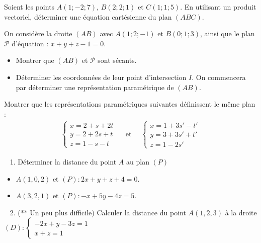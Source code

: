 \documentclass[letterpaper,10pt,english]{jupyterBook}
\begin{document}
\sphinxAtStartPar
{} Soient les points \(A(1;-2;7)\), \(B(2;2;1)\) et \(C(1;1;5)\). En utilisant un produit vectoriel, déterminer une équation cartésienne du plan \((ABC)\).

\sphinxAtStartPar
{} On considère la droite \((AB)\) avec \(A(1;2;-1)\) et \(B(0;1;3)\), ainsi que le plan \(\mathcal{P}\) d’équation : \(x+y+z-1=0\).
\begin{itemize}
\item {} 
\sphinxAtStartPar
Montrer que \((AB)\) et \(\mathcal{P}\) sont sécants.

\item {} 
\sphinxAtStartPar
Déterminer les coordonnées de leur point d’intersection \(I\). On commencera par déterminer une représentation paramétrique de \((AB)\).

\end{itemize}

\sphinxAtStartPar
{} Montrer que les représentations paramétriques suivantes
définissent le même plan :
\begin{equation*}
\begin{split}
\left\{ \begin{array}{l}x=2+s+2t \\ y=2+2s+t \\ z=1-s-t \end{array} \right.
\quad \text{ et } \quad  \left\{ \begin{array}{l} x=1+3s'-t'\\ y=3+3s'+t'\\ z=1-2s' \end{array} \right.
\end{split}
\end{equation*}
\sphinxAtStartPar
{}

\sphinxAtStartPar
  1. Déterminer la distance du point \(A\) au plan \((P)\)
\begin{itemize}
\item {} 
\sphinxAtStartPar
\(A(1,0,2)\) et \((P): 2x+y+z+4=0\).

\item {} 
\sphinxAtStartPar
\(A(3,2,1)\) et \((P): -x+5y-4z=5\).

\end{itemize}

\sphinxAtStartPar
  2. (** Un peu plus difficile) Calculer la distance du point \(A(1,2,3)\) à la droite
\((D):  \left\{ \begin{array}{l}
-2x+y-3z=1\\ x+z=1  \end{array} \right.\)







\renewcommand{\indexname}{Index}
\printindex
\end{document}
